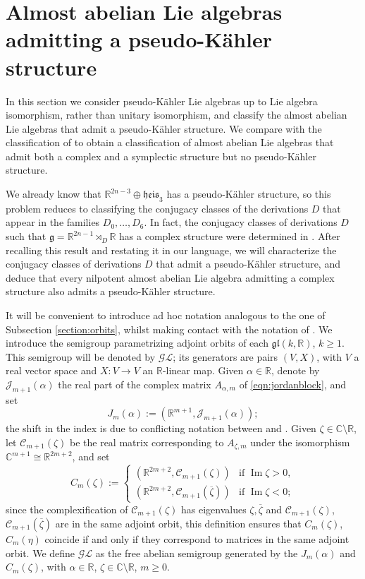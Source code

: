 \documentclass{article}
\theoremstyle{definition}
\newcommand{\R}{\mathbb{R}}
\newcommand{\C}{\mathbb{C}}
\newcommand{\frg}{\mathfrak{g}}
\newcommand{\lie}[1]{\mathfrak{#1}}
\DeclareMathOperator{\im}{Im}
\newcommand{\gl}{\lie{gl}}
\begin{document}
\section{Almost abelian Lie algebras admitting a pseudo-Kähler structure}\label{section:complex_PK}

In this section we consider pseudo-Kähler Lie algebras up to Lie algebra isomorphism, rather than unitary isomorphism, and classify the almost abelian Lie algebras that admit a pseudo-Kähler structure. We compare with the classification of \cite{ArroyoBarberisDiazGodoyHernandez} to obtain a classification of almost abelian Lie algebras that admit both a complex and a symplectic structure but no pseudo-Kähler structure.\medskip

We already know that $\R^{2n-3}\oplus\mathfrak{heis}_3$ has a pseudo-Kähler structure, so this problem reduces to classifying the conjugacy classes of the derivations $D$ that appear in the families $D_0,\dotsc, D_6$. In fact, the conjugacy classes of derivations $D$ such that $\frg=\R^{2n-1}\rtimes_D\R$ has a complex structure were determined in \cite{ArroyoBarberisDiazGodoyHernandez}. After recalling this result and restating it in our language, we will characterize the conjugacy classes of derivations $D$ that admit a pseudo-Kähler structure, and deduce that every nilpotent almost abelian Lie algebra admitting a complex structure also admits a pseudo-Kähler structure.\medskip

It will be convenient to introduce ad hoc notation analogous to the one of Subsection \ref{section:orbits}, whilst making contact with the notation of \cite{ArroyoBarberisDiazGodoyHernandez}. We introduce the semigroup parametrizing adjoint orbits of each $\gl(k,\R)$, $k\geq1$. This semigroup will be denoted by $\mathcal{GL}$; its generators are pairs $(V,X)$, with $V$ a real vector space and $X\colon V\to V$ an $\R$-linear map. Given $\alpha\in\R$, denote by $\mathcal{J}_{m+1}(\alpha)$ the real part of the complex matrix $A_{\alpha,m}$ of \eqref{eqn:jordanblock}, and set $$J_m(\alpha):=(\R^{m+1},\mathcal{J}_{m+1}(\alpha));$$ the shift in the index is due to conflicting notation between \cite{ArroyoBarberisDiazGodoyHernandez} and \cite{Burgoyne_Cushman_1977}. Given $\zeta\in\C\setminus\R$, let $\mathcal{C}_{m+1}(\zeta)$ be the real matrix corresponding to $A_{\zeta,m}$ under the isomorphism $\C^{m+1}\cong\R^{2m+2}$, and set $$C_m(\zeta):=\begin{cases}
    (\R^{2m+2},\mathcal{C}_{m+1}(\zeta))&\text{if }\im\zeta>0,\\
    (\R^{2m+2},\mathcal{C}_{m+1}(\overline\zeta))&\text{if }\im\zeta<0;
\end{cases}$$ since the complexification of $\mathcal{C}_{m+1}(\zeta)$ has eigenvalues $\zeta,\overline\zeta$ and $\mathcal{C}_{m+1}(\zeta)$, $\mathcal{C}_{m+1}(\overline\zeta)$ are in the same adjoint orbit, this definition ensures that $C_m(\zeta)$, $C_m(\eta)$ coincide if and only if they correspond to matrices in the same adjoint orbit. We define $\mathcal{GL}$ as the free abelian semigroup generated by the $J_m(\alpha)$ and $C_m(\zeta)$, with $\alpha\in\R$, $\zeta\in\C\setminus\R$, $m\geq0$.\medskip
\end{document}
